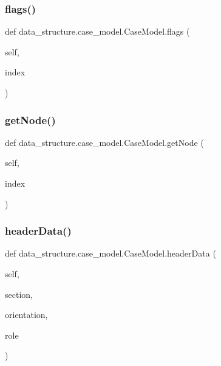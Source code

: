 \subsubsection{\texorpdfstring{flags()}{flags()}}
{\footnotesize\ttfamily def data\+\_\+structure.\+case\+\_\+model.\+Case\+Model.\+flags (\begin{DoxyParamCaption}\item[{}]{self,  }\item[{}]{index }\end{DoxyParamCaption})}

\hypertarget{a00082_ad19222ac3eb114c51dce157ae50b2e19}{}\label{a00082_ad19222ac3eb114c51dce157ae50b2e19} 
\subsubsection{\texorpdfstring{get\+Node()}{getNode()}}
{\footnotesize\ttfamily def data\+\_\+structure.\+case\+\_\+model.\+Case\+Model.\+get\+Node (\begin{DoxyParamCaption}\item[{}]{self,  }\item[{}]{index }\end{DoxyParamCaption})}

\hypertarget{a00082_a6a1656f6697b334ba6112c194cf04611}{}\label{a00082_a6a1656f6697b334ba6112c194cf04611} 
\subsubsection{\texorpdfstring{header\+Data()}{headerData()}}
{\footnotesize\ttfamily def data\+\_\+structure.\+case\+\_\+model.\+Case\+Model.\+header\+Data (\begin{DoxyParamCaption}\item[{}]{self,  }\item[{}]{section,  }\item[{}]{orientation,  }\item[{}]{role }\end{DoxyParamCaption})}

